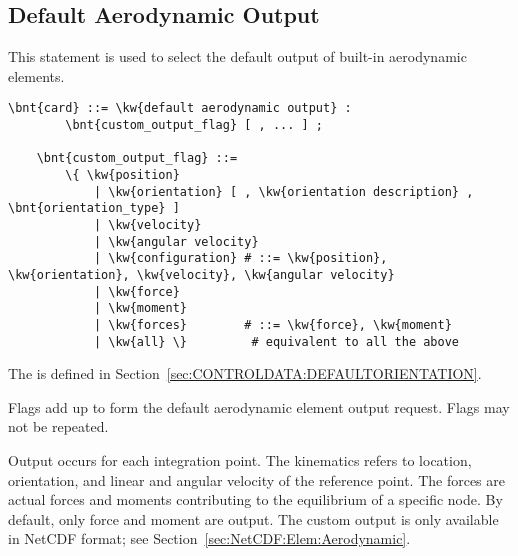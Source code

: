 \subsection{Default Aerodynamic Output}\label{sec:CONTROLDATA:DEFAULTAERODYNAMICOUTPUT}
This statement is used to select the default output of built-in aerodynamic elements.
\begin{Verbatim}[commandchars=\\\{\}]
    \bnt{card} ::= \kw{default aerodynamic output} :
        \bnt{custom_output_flag} [ , ... ] ;

    \bnt{custom_output_flag} ::=
        \{ \kw{position}
            | \kw{orientation} [ , \kw{orientation description} , \bnt{orientation_type} ]
            | \kw{velocity}
            | \kw{angular velocity}
            | \kw{configuration} # ::= \kw{position}, \kw{orientation}, \kw{velocity}, \kw{angular velocity}
            | \kw{force}
            | \kw{moment}
            | \kw{forces}        # ::= \kw{force}, \kw{moment}
            | \kw{all} \}         # equivalent to all the above
\end{Verbatim}
The  is defined
in Section~\ref{sec:CONTROLDATA:DEFAULTORIENTATION}.

Flags add up to form the default aerodynamic element output request.
Flags may not be repeated.

Output occurs for each integration point.
The kinematics refers to location, orientation,
and linear and angular velocity of the reference point.
The forces are actual forces and moments contributing
to the equilibrium of a specific node.
By default, only force and moment are output.
The custom output is only available in NetCDF format;
see Section~\ref{sec:NetCDF:Elem:Aerodynamic}.


